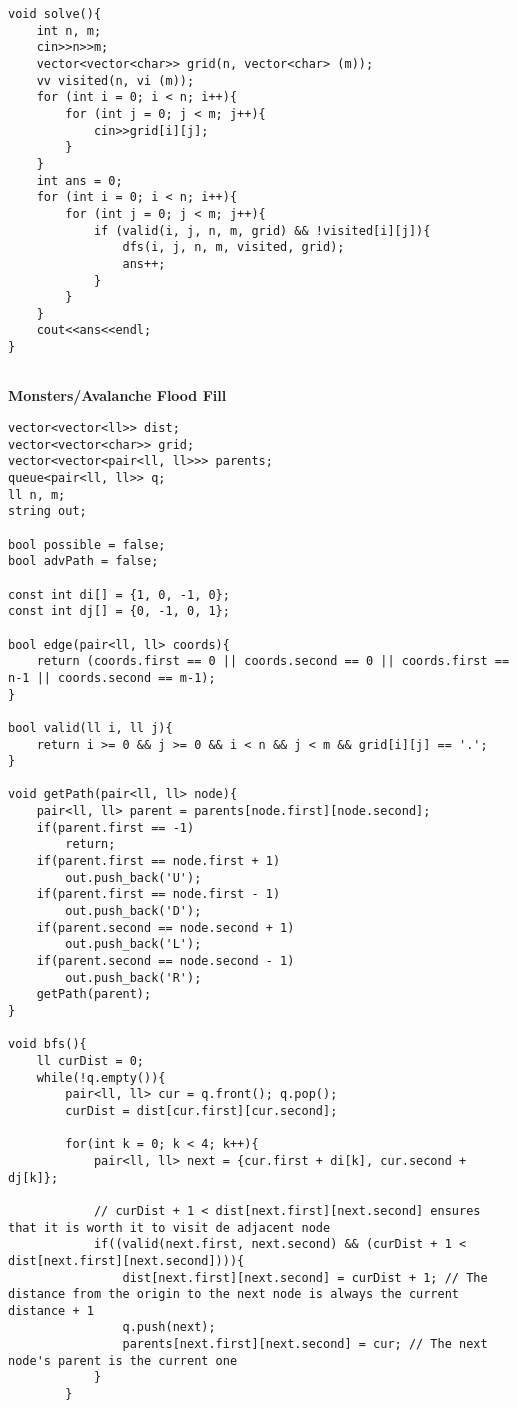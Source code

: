 \documentclass{article}
\begin{document}
\begin{multicols}{2}
\begin{lstlisting}
void solve(){
	int n, m;
	cin>>n>>m;
	vector<vector<char>> grid(n, vector<char> (m));
	vv visited(n, vi (m));
	for (int i = 0; i < n; i++){
		for (int j = 0; j < m; j++){
			cin>>grid[i][j];
		}
	}
	int ans = 0;
	for (int i = 0; i < n; i++){
		for (int j = 0; j < m; j++){
			if (valid(i, j, n, m, grid) && !visited[i][j]){
				dfs(i, j, n, m, visited, grid);
				ans++;
			}
		}
	}
	cout<<ans<<endl;
}
	
\end{lstlisting}

\large
\huge\textbf{Monsters/Avalanche Flood Fill}
\large
\begin{lstlisting}
vector<vector<ll>> dist;
vector<vector<char>> grid;
vector<vector<pair<ll, ll>>> parents;
queue<pair<ll, ll>> q;
ll n, m; 
string out;

bool possible = false;
bool advPath = false;

const int di[] = {1, 0, -1, 0};
const int dj[] = {0, -1, 0, 1};

bool edge(pair<ll, ll> coords){
    return (coords.first == 0 || coords.second == 0 || coords.first == n-1 || coords.second == m-1);
}

bool valid(ll i, ll j){
    return i >= 0 && j >= 0 && i < n && j < m && grid[i][j] == '.';
}

void getPath(pair<ll, ll> node){
    pair<ll, ll> parent = parents[node.first][node.second];
    if(parent.first == -1)
        return;
    if(parent.first == node.first + 1)
        out.push_back('U');
    if(parent.first == node.first - 1)
        out.push_back('D');
    if(parent.second == node.second + 1)
        out.push_back('L');
    if(parent.second == node.second - 1)
        out.push_back('R');
    getPath(parent);
}

void bfs(){
    ll curDist = 0;
    while(!q.empty()){
        pair<ll, ll> cur = q.front(); q.pop();   
        curDist = dist[cur.first][cur.second];

        for(int k = 0; k < 4; k++){
            pair<ll, ll> next = {cur.first + di[k], cur.second + dj[k]};

            // curDist + 1 < dist[next.first][next.second] ensures that it is worth it to visit de adjacent node
            if((valid(next.first, next.second) && (curDist + 1 < dist[next.first][next.second]))){
                dist[next.first][next.second] = curDist + 1; // The distance from the origin to the next node is always the current distance + 1
                q.push(next);
                parents[next.first][next.second] = cur; // The next node's parent is the current one
            }
        }


\end{lstlisting}
\end{multicols}
\end{document}
